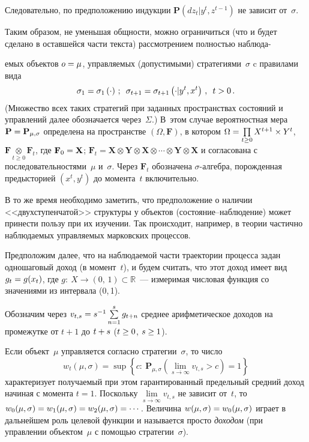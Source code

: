\begin{multicols}{2}
  Следовательно, по предположению индукции $\mathbf{P}\left( dz_t\vert y^t,z^{t-
1}\right)$ не зависит от~$\sigma$.
  
  Таким образом, не уменьшая общности, можно ограничиться (что и будет сделано в 
оставшейся части текста) рассмотрением полностью наблюда-\linebreak\vspace*{-12pt}

\pagebreak

\noindent
емых объектов $o\hm=\mu$, 
управляемых (допустимыми) стратегиями~$\sigma$ c правилами вида
  $$
  \sigma_1=\sigma_1\left(\cdot\right)\,;\enskip \sigma_{t+1}=\sigma_{t+1}\left( \cdot \vert 
y^t,x^t\right)\,,\enskip t>0\,.
  $$
(Множество всех таких стратегий при заданных пространствах состояний и управлений 
далее обозначается через~$\Sigma$.) В~этом случае вероятностная мера 
$\mathbf{P}\hm=\mathbf{P}_{\mu,\sigma}$ определена на пространстве $(\Omega, 
\mathbf{F})$, в котором $\Omega\hm=\prod\limits_{t\geq0} X^{t+1}\times Y^t$, 
$\mathbf{F}\mathop{\otimes}\limits_{t\geq0} \mathbf{F}_t$, где $\mathbf{F}_0\hm=\mathbf{X}$; 
$\mathbf{F}_t=\mathbf{X}\otimes \mathbf{Y}\otimes \mathbf{X}\otimes \cdots \otimes 
\mathbf{Y}\otimes \mathbf{X}$ и согласована с последовательностями~$\mu$ и~$\sigma$. 
Через $\mathbf{F}_t$ обозначена $\sigma$-ал\-геб\-ра, порожденная предысторией 
$(x^t,y^t)$ до момента~$t$ включительно.
  
  В то же время необходимо заметить, что предположение о наличии 
<<двухступенчатой>> структуры у объектов (со\-сто\-яние--наблю\-де\-ние) может 
принести пользу при их изучении. Так происходит, например, в теории частично 
наблюдаемых управляемых марковских процессов.
  
  Предположим далее, что на наблюдаемой части траектории процесса задан 
одношаговый доход (в момент~$t$), и будем считать, что этот доход имеет вид 
$g_t\hm=g(x_t)$, где $g:\ X\rightarrow (0,\,1)\subset \mathbb{R}$~--- измеримая числовая 
функция со значениями из интервала (0,\,1).
  
  Обозначим через $v_{t,s}\hm=s^{-1}\sum\limits_{n=1}^s g_{t+n}$ среднее 
арифметическое доходов на промежутке от $t+1$ до $t\hm+s$ ($t\hm\geq0$, $s\hm\geq 1$).
  
  Если объект~$\mu$ управляется согласно стратегии~$\sigma$, то число
  $$
  w_t(\mu,\sigma) =\sup \left\{ c:\ \mathbf{P}_{\mu,\sigma} \left( 
\lim\limits_{\overline{s\rightarrow\infty}} v_{t,s}>c\right) =1\right\}
  $$
характеризует получаемый при этом гарантированный предельный средний доход 
начиная с момента $t=1$. Поскольку $\lim\limits_{\overline{s\rightarrow\infty}} v_{t,s}$ не 
зависит от~$t$, то $w_0(\mu,\sigma)\hm=w_1(\mu,\sigma)\hm=w_2(\mu,\sigma)\hm=\cdots$. 
Величина $w(\mu,\sigma)\hm=w_0(\mu,\sigma)$ играет в дальнейшем роль целевой 
функции и называется просто \textit{доходом} (при управлении объектом~$\mu$ с 
помощью стратегии~$\sigma$).
  

\end{multicols}
